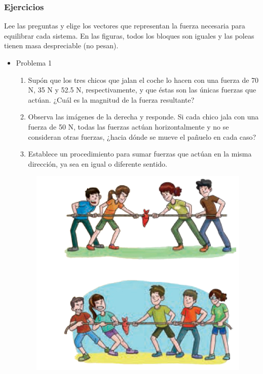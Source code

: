 \documentclass[11pt]{book}
\begin{document}
\subsubsection{Ejercicios}
Lee las preguntas y elige los vectores que representan la fuerza necesaria para
equilibrar cada sistema. En las figuras, todos los bloques son iguales
y las poleas tienen masa despreciable (no pesan).
\begin{itemize}
  \item Problema 1
        \begin{boxK}
          \begin{minipage}[t]{0.65\textwidth}
            \footnotesize
            \begin{enumerate}
              \item Supón que los tres chicos que jalan el coche lo hacen con una fuerza
                    de 70 N, 35 N y 52.5 N, respectivamente, y que éstas son las únicas
                    fuerzas que actúan.
                    ¿Cuál es la magnitud de la fuerza resultante?
              \item Observa las imágenes de la derecha y responde.
                    Si cada chico jala con una fuerza de 50 N, todas las fuerzas actúan
                    horizontalmente y no se consideran otras fuerzas, ¿hacia dónde se
                    mueve el pañuelo en cada caso?
              \item Establece un procedimiento para sumar fuerzas que actúan en la misma
                    dirección, ya sea en igual o diferente sentido.
            \end{enumerate}
          \end{minipage}\hfill
          \begin{minipage}[t]{0.3\linewidth}
            \begin{figure}[H]
              \centering
              \includegraphics[width=\linewidth]{cuerda_ninios.png}

\end{figure}
\end{minipage}
\end{boxK}
\end{itemize}
\end{document}
